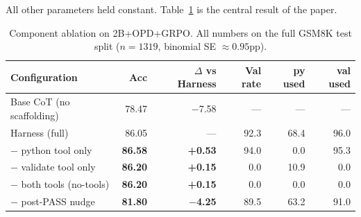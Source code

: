 \documentclass[10pt]{article}
\begin{document}
All other parameters held constant. Table~\ref{tab:ablation} is the central result of the paper.

\begin{table}[h]
\centering
\caption{Component ablation on 2B+OPD+GRPO. All numbers on the full GSM8K test split ($n=1319$, binomial SE $\approx 0.95$pp).}
\label{tab:ablation}
\begin{tabular}{lrrrrr}
\toprule
Configuration & Acc & $\Delta$ vs Harness & Val rate & py used & val used \\
\midrule
Base CoT (no scaffolding) & 78.47 & $-$7.58 & --- & --- & --- \\
Harness (full) & 86.05 & --- & 92.3 & 68.4 & 96.0 \\
$-$ python tool only & \textbf{86.58} & \textbf{+0.53} & 94.0 & 0.0 & 95.3 \\
$-$ validate tool only & \textbf{86.20} & \textbf{+0.15} & 0.0 & 10.9 & 0.0 \\
$-$ both tools (no-tools) & \textbf{86.20} & \textbf{+0.15} & 0.0 & 0.0 & 0.0 \\
$-$ post-PASS nudge & \textbf{81.80} & \textbf{$-$4.25} & 89.5 & 63.2 & 91.0 \\
\bottomrule
\end{tabular}
\end{table}
\end{document}
